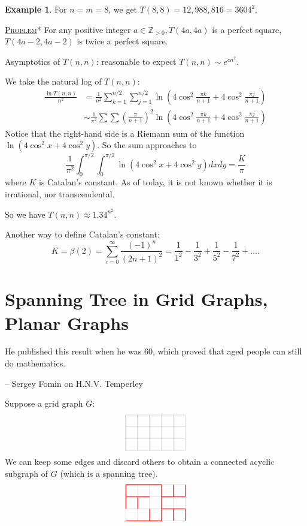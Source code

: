 \documentclass{report}
\newcommand{\Z}{\mathbb{Z}}
\newcommand{\fancyem}[1]{\underline{\textsc{#1}}}
\theoremstyle{definition}
\newtheorem{example}{Example}[section]
\theoremstyle{remark}
\numberwithin{equation}{section}
\begin{document}
\begin{example}
For $n = m = 8$, we get $T(8, 8) = 12,988,816 = 3604^2.$
\end{example}

\fancyem{Problem}* For any positive integer $a \in \Z_{>0}, T(4a, 4a)$ is a perfect square, $T(4a - 2, 4a - 2)$ is twice a perfect square.

Asymptotics of $T(n, n)$: reasonable to expect $T(n, n) \sim e^{cn^2}$.

We take the natural log of $T(n, n)$:
\begin{align*}
\frac{\ln T(n, n)}{n^2} & = \frac{1}{n^2}\sum_{k=1}^{n/2}\sum_{j=1}^{n/2} \ln\left(4\cos^2\frac{\pi k}{n+1} + 4\cos^2\frac{\pi j}{n+1}\right) \\
& \sim \frac{1}{\pi^2}\sum\sum \left(\frac{\pi}{n+1}\right)^2 \ln\left(4\cos^2\frac{\pi k}{n+1} + 4\cos^2\frac{\pi j}{n+1}\right)
\end{align*}
Notice that the right-hand side is a Riemann sum of the function $\ln(4\cos^2x+4\cos^2y)$. So the sum approaches to 
\[
\frac{1}{\pi^2} \int_0^{\pi/2}\int_0^{\pi/2} \ln(4\cos^2x+4\cos^2y)dxdy = \frac{K}{\pi}
\]
where $K$ is Catalan's constant. As of today, it is not known whether it is irrational, nor transcendental.

So we have $T(n, n) \approx 1.34^{n^2}.$

Another way to define Catalan's constant:
\[
K = \beta(2) = \sum_{i=0}^\infty \frac{(-1)^n}{(2n+1)^2} = \frac{1}{1^2} - \frac{1}{3^2} + \frac{1}{5^2} - \frac{1}{7^2} + \ldots.
\]

\section{Spanning Tree in Grid Graphs, Planar Graphs}
\epigraph{He published this result when he was 60, which proved that aged people can still do mathematics.}{-- \textup{Sergey Fomin on H.N.V. Temperley}}
Suppose a grid graph $G$:
\[\begin{tikzpicture}
\draw[step=0.5cm,gray,very thin] (-1.5, 1) grid (1, -0.5);
\end{tikzpicture}\]
We can keep some edges and discard others to obtain a connected acyclic subgraph of $G$ (which is a spanning tree).
\[\begin{tikzpicture}
\draw[step=0.5cm,gray,very thin] (-1.5, 1) grid (1, -0.5);
\draw[red, thick] (-1.5, 1) -- (-1, 1);
\draw[red, thick] (-1.5, 1) -- (-1.5, 0.5);
\draw[red, thick] (-1, 1) -- (-0.5, 1);
\draw[red, thick] (-1.5, 0.5) -- (-1, 0.5);
\draw[red, thick] (-1.5, 0.5) -- (-1.5, 0);
\draw[red, thick] (-1, 0.5) -- (-1, 0);
\draw[red, thick] (-1, 0.5) -- (-0.5, 0.5);
\draw[red, thick] (-1.5, -0.5) -- (-1, -0.5);
\draw[red, thick] (-0.5, 1) -- (0, 1);
\draw[red, thick] (-1, -0.5) -- (-0.5, -0.5);
\draw[red, thick] (-0.5, -0.5) -- (-0.5, 0);
\draw[red, thick] (0, 1) -- (0, 0.5);
\draw[red, thick] (0, 0.5) -- (0.5, 0.5);
\draw[red, thick] (0, 0.5) -- (0, 0) -- (0, -0.5) -- (-0.5, -0.5);
\draw[red, thick] (0.5, 0.5) -- (0.5, 1);
\draw[red, thick] (0.5, 0.5) -- (1, 0.5);
\draw[red, thick] (1, 0.5) -- (1, 1);
\draw[red, thick] (0, 0) -- (0.5, 0) -- (0.5, -0.5);
\draw[red, thick] (0.5, 0) -- (1, 0) -- (1, -0.5);
\end{tikzpicture}\]
\end{document}
